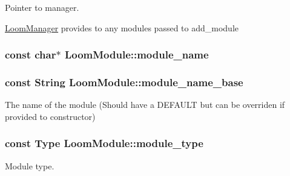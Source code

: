Pointer to manager. 

\hyperlink{class_loom_manager}{Loom\+Manager} provides to any modules passed to add\+\_\+module 
\subsubsection[{\texorpdfstring{module\+\_\+name}{module_name}}]{\setlength{\rightskip}{0pt plus 5cm}const char$\ast$ Loom\+Module\+::module\+\_\+name\hspace{0.3cm}{\ttfamily [protected]}}\hypertarget{class_loom_module_adf6e68ad7e9fa2acfca7a8a280680764}{}\label{class_loom_module_adf6e68ad7e9fa2acfca7a8a280680764}
\subsubsection[{\texorpdfstring{module\+\_\+name\+\_\+base}{module_name_base}}]{\setlength{\rightskip}{0pt plus 5cm}const String Loom\+Module\+::module\+\_\+name\+\_\+base\hspace{0.3cm}{\ttfamily [protected]}}\hypertarget{class_loom_module_a7cb2d5ef593dfc99e938c632f8843c84}{}\label{class_loom_module_a7cb2d5ef593dfc99e938c632f8843c84}


The name of the module (Should have a D\+E\+F\+A\+U\+LT but can be overriden if provided to constructor) 

\subsubsection[{\texorpdfstring{module\+\_\+type}{module_type}}]{\setlength{\rightskip}{0pt plus 5cm}const {\bf Type} Loom\+Module\+::module\+\_\+type\hspace{0.3cm}{\ttfamily [protected]}}\hypertarget{class_loom_module_a152d394f37236a2b159dae19da67eeb0}{}\label{class_loom_module_a152d394f37236a2b159dae19da67eeb0}


Module type. 

